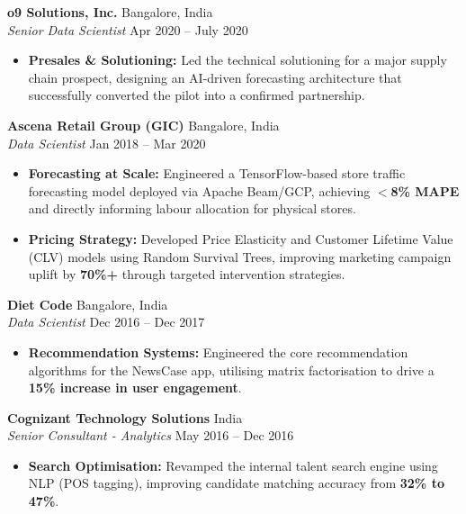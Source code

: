 \documentclass[11pt,a4paper]{article}
\begin{document}
\vspace{0.5em}

\noindent \textbf{o9 Solutions, Inc.} \hfill Bangalore, India \\
\textit{Senior Data Scientist} \hfill Apr 2020 -- July 2020
\begin{itemize}[leftmargin=*, label=\textbullet]
    \item \textbf{Presales \& Solutioning:} Led the technical solutioning for a major supply chain prospect, designing an AI-driven forecasting architecture that successfully converted the pilot into a confirmed partnership.
\end{itemize}

\vspace{0.5em}

\noindent \textbf{Ascena Retail Group (GIC)} \hfill Bangalore, India \\
\textit{Data Scientist} \hfill Jan 2018 -- Mar 2020
\begin{itemize}[leftmargin=*, label=\textbullet]
    \item \textbf{Forecasting at Scale:} Engineered a TensorFlow-based store traffic forecasting model deployed via Apache Beam/GCP, achieving \textbf{$<$8\% MAPE} and directly informing labour allocation for physical stores.
    \item \textbf{Pricing Strategy:} Developed Price Elasticity and Customer Lifetime Value (CLV) models using Random Survival Trees, improving marketing campaign uplift by \textbf{70\%+} through targeted intervention strategies.
\end{itemize}

\vspace{0.5em}

\noindent \textbf{Diet Code} \hfill Bangalore, India \\
\textit{Data Scientist} \hfill Dec 2016 -- Dec 2017
\begin{itemize}[leftmargin=*, label=\textbullet]
    \item \textbf{Recommendation Systems:} Engineered the core recommendation algorithms for the NewsCase app, utilising matrix factorisation to drive a \textbf{15\% increase in user engagement}.
\end{itemize}

\vspace{0.5em}

\noindent \textbf{Cognizant Technology Solutions} \hfill India \\
\textit{Senior Consultant - Analytics} \hfill May 2016 -- Dec 2016
\begin{itemize}[leftmargin=*, label=\textbullet]
    \item \textbf{Search Optimisation:} Revamped the internal talent search engine using NLP (POS tagging), improving candidate matching accuracy from \textbf{32\% to 47\%}.
\end{itemize}
\end{document}
